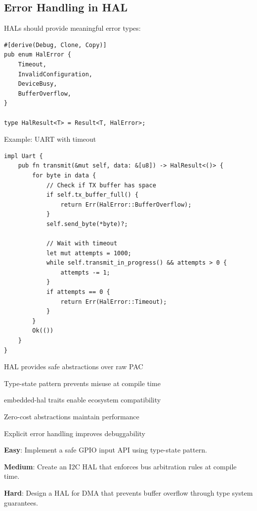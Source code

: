 \subsection{Error Handling in HAL}
\label{subsec:hal-errors}

HALs should provide meaningful error types:

\begin{verbatim}
#[derive(Debug, Clone, Copy)]
pub enum HalError {
    Timeout,
    InvalidConfiguration,
    DeviceBusy,
    BufferOverflow,
}

type HalResult<T> = Result<T, HalError>;
\end{verbatim}

\begin{example}
Example: UART with timeout
\end{example}

\begin{verbatim}
impl Uart {
    pub fn transmit(&mut self, data: &[u8]) -> HalResult<()> {
        for byte in data {
            // Check if TX buffer has space
            if self.tx_buffer_full() {
                return Err(HalError::BufferOverflow);
            }
            self.send_byte(*byte)?;
            
            // Wait with timeout
            let mut attempts = 1000;
            while self.transmit_in_progress() && attempts > 0 {
                attempts -= 1;
            }
            if attempts == 0 {
                return Err(HalError::Timeout);
            }
        }
        Ok(())
    }
}
\end{verbatim}

\begin{keytakeaways}
    \item HAL provides safe abstractions over raw PAC
    \item Type-state pattern prevents misuse at compile time
    \item embedded-hal traits enable ecosystem compatibility
    \item Zero-cost abstractions maintain performance
    \item Explicit error handling improves debuggability
\end{keytakeaways}

\begin{exercises}
    \item\textbf{Easy}: Implement a safe GPIO input API using type-state pattern.
    
    \item\textbf{Medium}: Create an I2C HAL that enforces bus arbitration rules at compile time.
    
    \item\textbf{Hard}: Design a HAL for DMA that prevents buffer overflow through type system guarantees.
\end{exercises}
